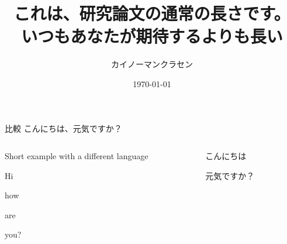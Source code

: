 \documentclass[aspectratio=169]{beamer}
\title[短いタイトル]{これは、研究論文の通常の長さです。
いつもあなたが期待するよりも長い}
\institute{研究所}
\author{カイノーマンクラセン}
\date{\today}
\begin{document}
\maketitle

\begin{frame}{比較}
  こんにちは、元気ですか？

  \begin{columns}[T]
    \begin{column}{.49\linewidth}
      \begin{vfilleditems}
        \item Short example with a different language
        \item Hi
        \item how
        \item are
        \item you?
      \end{vfilleditems}
    \end{column}
    \begin{column}{.49\linewidth}

      \begin{vfilleditems}
        \item こんにちは
        \item 元気ですか？
      \end{vfilleditems}
    \end{column}
  \end{columns}
\end{frame}
\end{document}
